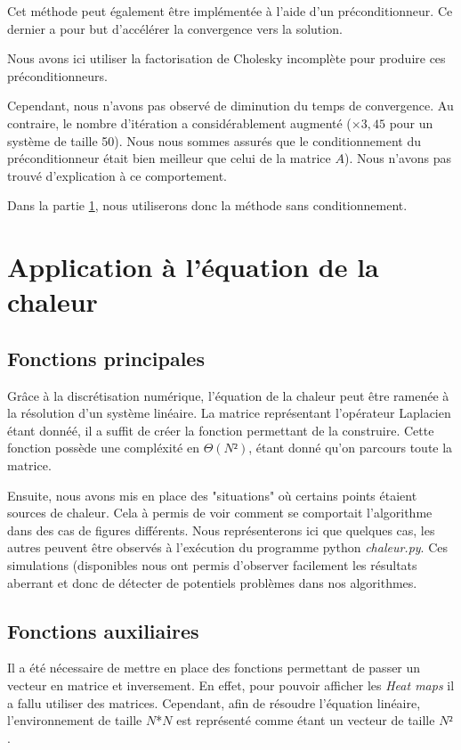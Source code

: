 \documentclass{article}
\begin{document}
\vspace{3mm}
Cet méthode peut également être implémentée à l'aide d'un préconditionneur. Ce dernier a pour but d'accélérer la convergence vers la solution.

Nous avons ici utiliser la factorisation de Cholesky incomplète pour produire ces préconditionneurs.

Cependant, nous n'avons pas observé de diminution du temps de convergence. Au contraire, le nombre d'itération a considérablement augmenté ($\times3,45$ pour un système de taille 50). Nous nous sommes assurés que le conditionnement du préconditionneur était bien meilleur que celui de la matrice $A$). Nous n'avons pas trouvé d'explication à ce comportement.

Dans la partie \ref{sec:eq_chaleur}, nous utiliserons donc la méthode sans conditionnement.


\section{Application à l'équation de la chaleur}
\label{sec:eq_chaleur}

\subsection{Fonctions principales}
\label{ssec:fonc_princ}
Grâce à la discrétisation numérique, l'équation de la chaleur peut être ramenée à la résolution d'un système linéaire. 
La matrice représentant l'opérateur Laplacien étant donnéé, il a suffit de créer la fonction permettant de la construire.
Cette fonction possède une compléxité en $\Theta(N²)$, étant donné qu'on parcours toute la matrice.

Ensuite, nous avons mis en place des "situations" où certains points étaient sources de chaleur. Cela à permis de voir comment se comportait l'algorithme dans des cas de figures différents. Nous représenterons ici que quelques cas, les autres peuvent être observés à l'exécution du programme python \emph{chaleur.py}. Ces simulations (disponibles nous ont permis d'observer facilement les résultats aberrant et donc de détecter de potentiels problèmes dans nos algorithmes.



\subsection{Fonctions auxiliaires}
\label{ssec:fonc_aux}
Il a été nécessaire de mettre en place des fonctions permettant de passer un vecteur en matrice et inversement.
En effet, pour pouvoir afficher les \emph{Heat maps} il a fallu utiliser des matrices. Cependant, afin de résoudre l'équation linéaire, l'environnement de taille $N$*$N$ est représenté comme étant un vecteur de taille $N²$.
\end{document}
